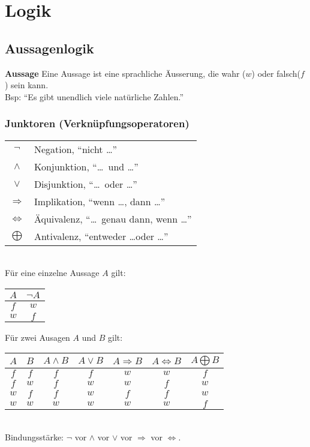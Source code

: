 \section{Logik}
\subsection{Aussagenlogik}
\textbf{Aussage} Eine Aussage ist eine sprachliche Äusserung, 
die wahr ($w$) oder falsch($f$) sein kann.\\
Bsp: \enquote{Es gibt unendlich viele natürliche Zahlen.}

\subsubsection{Junktoren (Verknüpfungsoperatoren)}
\begin{tabular}{cl}
	$\neg$				& Negation, \enquote{nicht \dots}\\
	$\wedge$ 			& Konjunktion, \enquote{\dots\ und \dots}\\
	$\vee$ 				& Disjunktion, \enquote{\dots\ oder \dots}\\
	$\Rightarrow$ 		& Implikation, \enquote{wenn \dots, dann \dots}\\
	$\Leftrightarrow$	& Äquivalenz, \enquote{\dots\ genau dann, wenn \dots} \\
	$\bigoplus$			& Antivalenz, \enquote{entweder \dots oder  \dots}\\
\end{tabular}\\

Für eine einzelne Aussage $A$ gilt:\\
\begin{tabular}{c||c}
	$A$ & $\neg A$ \\\hline
	$f$ & $w$ \\
	$w$ & $f$ \\
\end{tabular}

Für zwei Ausagen $A$ und $B$ gilt:\\
\begin{tabular}{c|c||c|c|c|c|c}
	$A$ & $B$ 	& $A \wedge B$ 	& $A \vee B$ 	& $A \Rightarrow B$ 	& $A \Leftrightarrow B$ 	& $A \bigoplus B$ \\\hline
	$f$ & $f$ 	& $f$				& $f$			& $w$				& $w$					 	& $f$\\
	$f$ & $w$ 	& $f$				& $w$			& $w$				& $f$					 	& $w$\\	
	$w$ & $f$ 	& $f$				& $w$			& $f$				& $f$						& $w$\\
	$w$ & $w$ 	& $w$				& $w$			& $w$				& $w$						& $f$\\
\end{tabular}\\
Bindungsstärke: $\neg$ vor $\wedge$ vor $\vee$ vor $\Rightarrow$ vor $\Leftrightarrow$.\\

